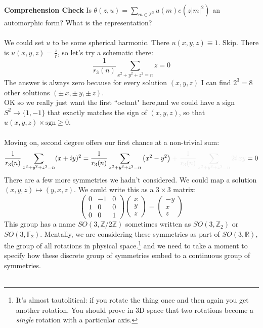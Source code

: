 \documentclass[12pt]{article}
\begin{document}
\noindent \textbf{Comprehension Check} Is $\displaystyle \theta(z, u)= \sum_{m \in \mathbb{Z}^3} u(m) e(z|m|^2)$ an automorphic form?  What is the representation? \\ \\
We could set $u$ to be some spherical harmonic.  There $u(x,y,z) \equiv 1$.  Skip.  There is $u(x,y,z) = \frac{z}{r}$, so let's try a schematic there:
$$ \frac{1}{r_3(n)} \sum_{x^2 + y^2 + z^2 = n} z = 0 $$
The answer is always zero because for every solution $(x,y,z)$ I can find $2^3 = 8$ other solutions $(\pm \,x, \pm \,y, \pm \,z)$. \\ 
OK so we really just want the first ``octant" here,and we could have a sign $S^2 \to \{ 1, -1\}$ that exactly matches the sign of $(x,y,z)$, so that $u(x,y,z) \times \text{sgn} \geq 0$.  \\ \\
Moving on, second degree offers our first chance at a non-trivial sum:
$$ \frac{1}{r_3(n)} \sum_{x^2 + y^2 + z^2 = n } (x + iy)^2 
 = \frac{1}{r_3(n)} \sum_{x^2 + y^2 + z^2 = n } \big( x^2 - y^2 \big) 
{\color{black!10!white}\;+\;\frac{1}{r_3(n)} \sum_{x^2 + y^2 + z^2 = n } 2i\, xy} = 0 $$
There are a few more symmetries we hadn't considered.  We could map a solution $(x,y,z) \mapsto (y,x, z)$.  We could write this as a $3 \times 3$ matrix:
$$ \left( \begin{array}{crc} 0 & -1 & 0 \\
1 & 0 & 0 \\ 0 & 0 & 1 \end{array}\right)
\left( \begin{array}{c}x \\ y \\ z \end{array}\right)
= \left( \begin{array}{r}-y \\ x \\ z \end{array}\right) $$
This group has a name $SO(3, \mathbb{Z}/2\mathbb{Z})$ sometimes written as
$SO(3, \mathbb{Z}_2)$ or $SO(3, \mathbb{F}_2)$. Mentally, we are considering these symmetries as part of $SO(3, \mathbb{R})$, the group of
all rotations in physical space.\footnote{It's almost tautolitical: if you rotate the thing once and then again you get another rotation.  You should prove in 3D space that two rotations become a \textit{single} rotation with a particular axis.} and we need to take a moment to specify how these {discrete} group of symmetries embed to a {continuous} group of symmetries. \\ \\
\end{document}

